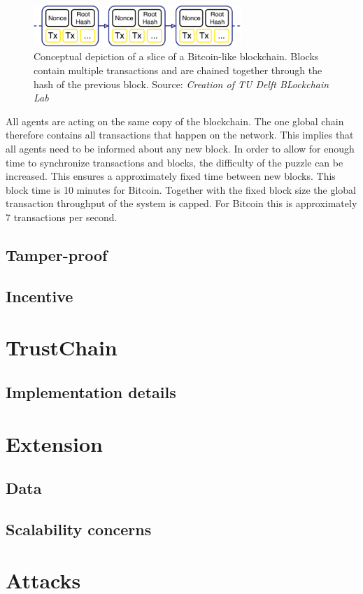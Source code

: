 \begin{figure}
    \centering
    \includegraphics[width=0.7\textwidth]{images/blockchain}
    \caption{Conceptual depiction of a slice of a Bitcoin-like blockchain. Blocks contain multiple transactions and are chained together through the hash of the previous block. Source: \textit{Creation of TU Delft BLockchain Lab}}
    \label{fig:basic_blockchain}
\end{figure}

All agents are acting on the same copy of the blockchain. The one global chain therefore contains 
all transactions that happen on the network. This implies that all agents need to be informed about any new block.
In order to allow for enough time to synchronize transactions and blocks, the difficulty of the puzzle 
can be increased. This ensures a approximately fixed time between new blocks. This block time is 
10 minutes for Bitcoin. Together with the fixed block size the global transaction throughput of the
system is capped. For Bitcoin this is approximately 7 transactions per second.

\subsection{Tamper-proof}


\subsection{Incentive}


\section{TrustChain}
\label{sec:trustchain}

\subsection{Implementation details}

\section{Extension}
\label{sec:extension}


\subsection{Data}
\subsection{}
\subsection{Scalability concerns}

\section{Attacks}